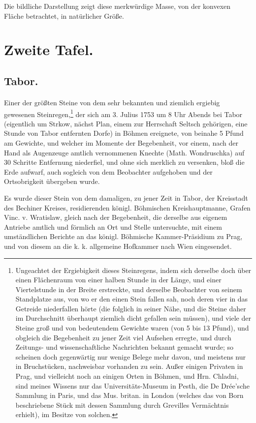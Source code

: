 \documentclass[a4paper, 11pt, oneside, german]{article}
\begin{document}
Die bildliche Darstellung zeigt diese merkwürdige Masse, von der konvexen Fläche betrachtet, in natürlicher Größe.
\clearpage
\section{Zweite Tafel.}
\subsection{Tabor.}
\paragraph{}
Einer der größten Steine von dem sehr bekannten und ziemlich ergiebig gewesenen Steinregen,\footnote{Ungeachtet der Ergiebigkeit dieses Steinregens, indem sich derselbe doch über einen Flächenraum von einer halben Stunde in der Länge, und einer Viertelstunde in der Breite erstreckte, und derselbe Beobachter von seinem Standplatze aus, von wo er den einen Stein fallen sah, noch deren vier in das Getreide niederfallen hörte (die folglich in seiner Nähe, und die Steine daher im Durchschnitt überhaupt ziemlich dicht gefallen sein müssen), und viele der Steine groß und von bedeutendem Gewichte waren (von 5 bis 13 Pfund), und obgleich die Begebenheit zu jener Zeit viel Aufsehen erregte, und durch Zeitungs- und wissenschaftliche Nachrichten bekannt gemacht wurde; so scheinen doch gegenwärtig nur wenige Belege mehr davon, und meistens nur in Bruchstücken, nachweisbar vorhanden zu sein. Außer einigen Privaten in Prag, und vielleicht noch an einigen Orten in Böhmen, und Hrn. Chladni, sind meines Wissens nur das Universitäts-Museum in Pesth, die De Drée'sche Sammlung in Paris, und das Mus. britan. in London (welches das von Born beschriebene Stück mit dessen Sammlung durch Grevilles Vermächtnis erhielt), im Besitze von solchen.} der sich am 3. Julius 1753 um 8 Uhr Abends bei Tabor (eigentlich um Strkow, nächst Plan, einem zur Herrschaft Seltsch gehörigen, eine Stunde von Tabor entfernten Dorfe) in Böhmen ereignete, von beinahe 5 Pfund am Gewichte, und welcher im Momente der Begebenheit, vor einem, nach der Hand als Augenzeuge amtlich vernommenen Knechte (Math. Wondruschka) auf 30 Schritte Entfernung niederfiel, und ohne sich merklich zu versenken, bloß die Erde aufwarf, auch sogleich von dem Beobachter aufgehoben und der Ortsobrigkeit übergeben wurde.

Es wurde dieser Stein von dem damaligen, zu jener Zeit in Tabor, der Kreisstadt des Bechiner Kreises, residierenden königl. Böhmischen Kreishauptmanne, Grafen Vinc. v. Wratislaw, gleich nach der Begebenheit, die derselbe aus eigenem Antriebe amtlich und förmlich an Ort und Stelle untersuchte, mit einem umständlichen Berichte an das königl. Böhmische Kammer-Präsidium zu Prag, und von diesem an die k. k. allgemeine Hofkammer nach Wien eingesendet.
\end{document}
